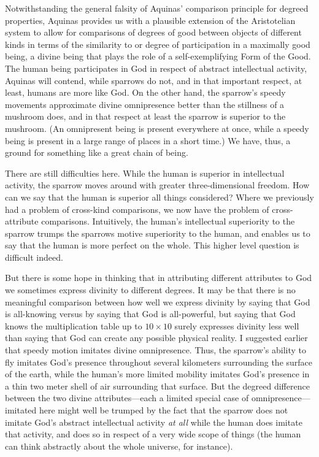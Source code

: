 Notwithstanding the general falsity of Aquinas' comparison principle for degreed properties, Aquinas provides us
with a plausible extension of the Aristotelian system to allow for comparisons of degrees of good between objects
of different kinds in terms of the similarity to or degree of participation in a maximally good being, a divine being
that plays the role of a self-exemplifying Form of the Good. The human being participates in God in respect of
abstract intellectual activity, Aquinas will contend, while sparrows do not, and in that important respect, at least,
humans are more like God. On the other hand, the sparrow's speedy movements approximate divine omnipresence better than 
the stillness of a mushroom does, and in that respect at least the sparrow is superior to the mushroom. (An omnipresent
being is present everywhere at once, while a speedy being is present in a large range of places in a short time.) 
We have, thus, a ground for something like a great chain of being.

There are still difficulties here. While the human is superior in intellectual activity, the sparrow moves around
with greater three-dimensional freedom. How can we say that the human is superior all things considered? Where we
previously had a problem of cross-kind comparisons, we now have the problem of cross-attribute comparisons. 
Intuitively, the human's intellectual superiority to the sparrow trumps the sparrows motive superiority to the
human, and enables us to say that the human is more perfect on the whole. This higher level question is difficult
indeed. 

But there is some hope in thinking that in attributing different attributes to God we sometimes express divinity
to different degrees. It may be that there is no meaningful comparison between how well we express divinity by
saying that God is all-knowing versus by saying that God is all-powerful, but saying that God knows the
multiplication table up to $10\times 10$ surely expresses divinity less well than saying that God can create any
possible physical reality. I suggested earlier that speedy motion imitates divine omnipresence. Thus, the sparrow's
ability to fly imitates God's presence throughout several kilometers surrounding the surface of the earth, while
the human's more limited mobility imitates God's presence in a thin two meter shell of air surrounding that surface.
But the degreed difference between the two divine attributes---each a limited special case of omnipresence---imitated here 
might well be trumped by the fact that the sparrow does not imitate God's abstract intellectual activity \textit{at all}
while the human does imitate that activity, and does so in respect of a very wide scope of things (the human can think
abstractly about the whole universe, for instance). 

